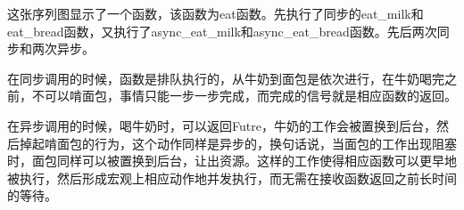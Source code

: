 这张序列图显示了一个函数，该函数为eat函数。先执行了同步的eat\_milk和eat\_bread函数，又执行了async\_eat\_milk和async\_eat\_bread函数。先后两次同步和两次异步。


在同步调用的时候，函数是排队执行的，从牛奶到面包是依次进行，在牛奶喝完之前，不可以啃面包，事情只能一步一步完成，而完成的信号就是相应函数的返回。


在异步调用的时候，喝牛奶时，可以返回Futre，牛奶的工作会被置换到后台，然后掉起啃面包的行为，这个动作同样是异步的，换句话说，当面包的工作出现阻塞时，面包同样可以被置换到后台，让出资源。这样的工作使得相应函数可以更早地被执行，然后形成宏观上相应动作地并发执行，而无需在接收函数返回之前长时间的等待。
